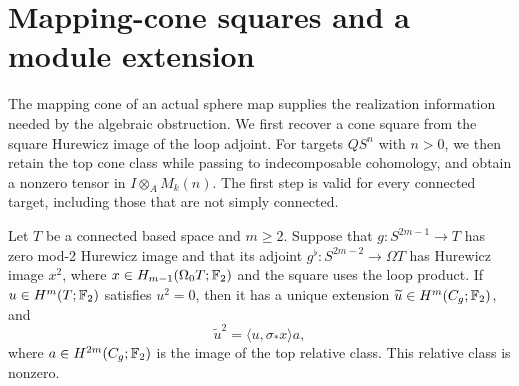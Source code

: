 \section{Mapping-cone squares and a module extension}\label{sec:cones}

The mapping cone of an actual sphere map supplies the realization
information needed by the algebraic obstruction. We first recover a
cone square from the square Hurewicz image of the loop adjoint.
For targets \(QS^n\) with \(n>0\), we then retain the top cone class
while passing to indecomposable cohomology, and obtain a nonzero tensor
in \(I\otimes_A M_k(n)\). The first step is valid for every connected
target, including those that are not simply connected.

\begin{lemma}\label{lem:cone-square}
Let \(T\) be a connected based space and \(m\ge2\). Suppose that
\(g:S^{2m-1}\to T\) has zero mod-2 Hurewicz image and that its adjoint
\(g^\flat:S^{2m-2}\to\Omega T\) has Hurewicz image \(x^2\), where
\(x\in H_{m-1}(\Omega_0T;\mathbb F_2)\) and the square uses the loop product.
If \(u\in H^m(T;\mathbb F_2)\) satisfies \(u^2=0\), then it has a unique
extension \(\widetilde u\in H^m(C_g;\mathbb F_2)\), and
\begin{equation}\label{eq:cone-square}
\widetilde u^2=\langle u,\sigma_*x\rangle a,
\end{equation}
where \(a\in H^{2m}(C_g;\mathbb F_2)\) is the image of the top relative class.
This relative class is nonzero.
\end{lemma}

